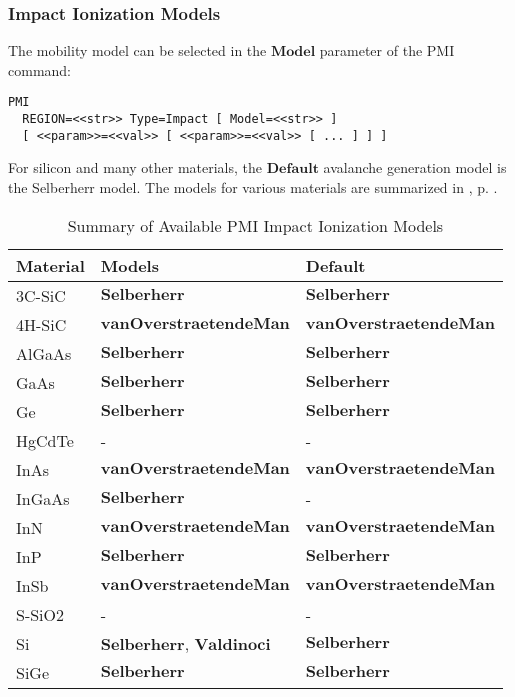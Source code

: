 \documentclass[oneside,12pt]{cgd_book}
\begin{document}
\subsubsection{Impact Ionization Models}
The mobility model can be selected in the $\mathbf{Model}$ parameter of the PMI
          command:
\par
\begin{lstlisting}[style=GeniusCmd]
PMI
  REGION=<<str>> Type=Impact [ Model=<<str>> ]
  [ <<param>>=<<val>> [ <<param>>=<<val>> [ ... ] ] ]
\end{lstlisting}
For silicon and many other materials, the $\mathbf{Default}$ avalanche generation model is
          the Selberherr model. The models for various materials are summarized in
, p. \pageref{tab:CmdRef:PMI:Avalanche:Summary}.
\par
\begin{longtable}{lll}
\caption{\label{tab:CmdRef:PMI:Avalanche:Summary}Summary of Available PMI Impact Ionization Models}\\
\hline
 Material
& Models
& Default\\
\hline
3C-SiC
& $\mathbf{Selberherr}$
& $\mathbf{Selberherr}$
\\
 4H-SiC
& $\mathbf{vanOverstraetendeMan}$
& $\mathbf{vanOverstraetendeMan}$
\\
 AlGaAs
& $\mathbf{Selberherr}$
& $\mathbf{Selberherr}$
\\
 GaAs
& $\mathbf{Selberherr}$
& $\mathbf{Selberherr}$
\\
 Ge
& $\mathbf{Selberherr}$
& $\mathbf{Selberherr}$
\\
 HgCdTe
& -
& -
\\
 InAs
& $\mathbf{vanOverstraetendeMan}$
& $\mathbf{vanOverstraetendeMan}$
\\
 InGaAs
& $\mathbf{Selberherr}$
& -
\\
 InN
& $\mathbf{vanOverstraetendeMan}$
& $\mathbf{vanOverstraetendeMan}$
\\
 InP
& $\mathbf{Selberherr}$
& $\mathbf{Selberherr}$
\\
 InSb
& $\mathbf{vanOverstraetendeMan}$
& $\mathbf{vanOverstraetendeMan}$
\\
 S-SiO2
& -
& -
\\
 Si
& $\mathbf{Selberherr}$, $\mathbf{Valdinoci}$
& $\mathbf{Selberherr}$
\\
 SiGe
& $\mathbf{Selberherr}$
& $\mathbf{Selberherr}$\\
\end{longtable}
\end{document}
